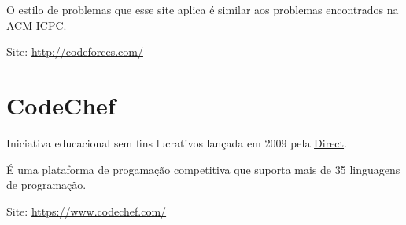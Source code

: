 O estilo de problemas que esse site aplica é similar aos problemas encontrados na ACM-ICPC.

Site: \href{http://codeforces.com/}{http://codeforces.com/}

\section{CodeChef}

Iniciativa educacional sem fins lucrativos lançada em 2009 pela \href{http://www.directi.com/}{Direct}.

É uma plataforma de progamação competitiva que suporta mais de 35 linguagens de programação.

Site: \href{https://www.codechef.com/}{https://www.codechef.com/}

